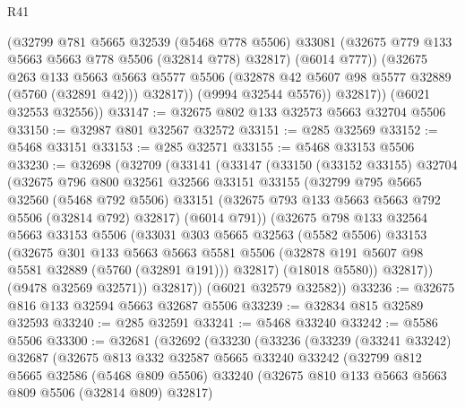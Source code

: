 \begin{lexlean}{R41}
\begin{coremodule}
              (@32799
                @781
                @5665
                @32539
                (@5468 @778 @5506)
                @33081
                (@32675 @779 @133 @5663 @5663 @778 @5506 (@32814 @778) @32817)
                (@6014 @777))
              (@32675
                @263
                @133
                @5663
                @5663
                @5577
                @5506
                (@32878 @42 @5607 @98 @5577 @32889 (@5760 (@32891 @42)))
                @32817))
            (@9994 @32544 @5576))
          @32817))
      (@6021 @32553 @32556))
@33147 := @32675 @802 @133 @32573 @5663 @32704 @5506
@33150 := @32987 @801 @32567 @32572
@33151 := @285 @32569
@33152 := @5468 @33151
@33153 := @285 @32571
@33155 := @5468 @33153 @5506
@33230 := @32698
    (@32709
      (@33141
        (@33147
          (@33150
            (@33152 @33155)
            @32704
            (@32675
              @796
              @800
              @32561
              @32566
              @33151
              @33155
              (@32799
                @795
                @5665
                @32560
                (@5468 @792 @5506)
                @33151
                (@32675 @793 @133 @5663 @5663 @792 @5506 (@32814 @792) @32817)
                (@6014 @791))
              (@32675
                @798
                @133
                @32564
                @5663
                @33153
                @5506
                (@33031
                  @303
                  @5665
                  @32563
                  (@5582 @5506)
                  @33153
                  (@32675
                    @301
                    @133
                    @5663
                    @5663
                    @5581
                    @5506
                    (@32878 @191 @5607 @98 @5581 @32889 (@5760 (@32891 @191)))
                    @32817)
                  (@18018 @5580))
                @32817))
            (@9478 @32569 @32571))
          @32817))
      (@6021 @32579 @32582))
@33236 := @32675 @816 @133 @32594 @5663 @32687 @5506
@33239 := @32834 @815 @32589 @32593
@33240 := @285 @32591
@33241 := @5468 @33240
@33242 := @5586 @5506
@33300 := @32681
    (@32692
      (@33230
        (@33236
          (@33239
            (@33241 @33242)
            @32687
            (@32675
              @813
              @332
              @32587
              @5665
              @33240
              @33242
              (@32799
                @812
                @5665
                @32586
                (@5468 @809 @5506)
                @33240
                (@32675 @810 @133 @5663 @5663 @809 @5506 (@32814 @809) @32817)

\end{coremodule}
\end{lexlean}
